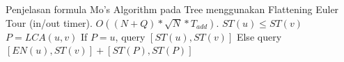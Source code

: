 Penjelasan formula Mo's Algorithm pada Tree menggunakan Flattening Euler Tour (in/out timer).
$O((N + Q) * \sqrt{N} * T_{add})$.
$ST(u) \leq ST(v)$ \newline
$P = LCA(u, v)$ \newline
     If $P = u$, query $[ST(u), ST(v)]$ \newline
             Else query $[EN(u), ST(v)] + [ST(P), ST(P)]$
